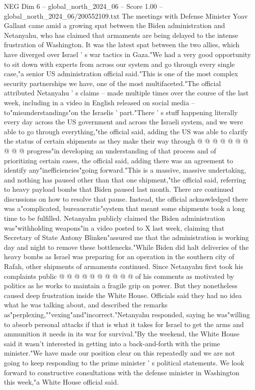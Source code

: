 \begin{textsample}{NEG Dim 6 – global\_north\_2024\_06 – Score 1.00 – global\_north\_2024\_06/200552109.txt}  \label{ex:f6_neg_313}
The meetings with Defense Minister Yoav Gallant came amid a growing spat between the Biden administration and Netanyahu, who has claimed that armaments are being delayed to the intense frustration of Washington.
It was the latest spat between the two allies, which have diverged over Israel ' s war tactics in Gaza."We had a very good opportunity to sit down with experts from across our system and go through every single case,"a senior US administration official said."This is one of the most complex security partnerships we have, one of the most multifaceted."The official attributed Netanyahu ' s claims -- made multiple times over the course of the last week, including in a video in English released on social media -- to"misunderstandings"on the Israelis ' part."There ' s stuff happening literally every day across the US government and across the Israeli system, and we were able to go through everything,"the official said, adding the US was able to clarify the status of certain shipments as they make their way through @ @ @ @ @ @ @ @ @ @ progress"in developing an understanding of that process and of prioritizing certain cases, the official said, adding there was an agreement to identify any"inefficiencies"going forward."This is a massive, massive undertaking, and nothing has paused other than that one shipment,"the official said, referring to heavy payload bombs that Biden paused last month.
There are continued discussions on how to resolve that pause.
Instead, the official acknowledged there was a"complicated, bureaucratic"system that meant some shipments took a long time to be fulfilled.
Netanyahu publicly claimed the Biden administration was"withholding weapons"in a video posted to X last week, claiming that Secretary of State Antony Blinken"assured me that the administration is working day and night to remove these bottlenecks."While Biden did halt deliveries of the heavy bombs as Israel was preparing for an operation in the southern city of Rafah, other shipments of armaments continued.
Since Netanyahu first took his complaints public @ @ @ @ @ @ @ @ @ @ of his comments as motivated by politics as he works to maintain a fragile grip on power.
But they nonetheless caused deep frustration inside the White House.
Officials said they had no idea what he was talking about, and described the remarks as"perplexing,""vexing"and"incorrect."Netanyahu responded, saying he was"willing to absorb personal attacks if that is what it takes for Israel to get the arms and ammunition it needs in its war for survival."By the weekend, the White House said it wasn't interested in getting into a back-and-forth with the prime minister."We have made our position clear on this repeatedly and we are not going to keep responding to the prime minister ' s political statements.
We look forward to constructive consultations with the defense minister in Washington this week,"a White House official said.

\end{textsample}
